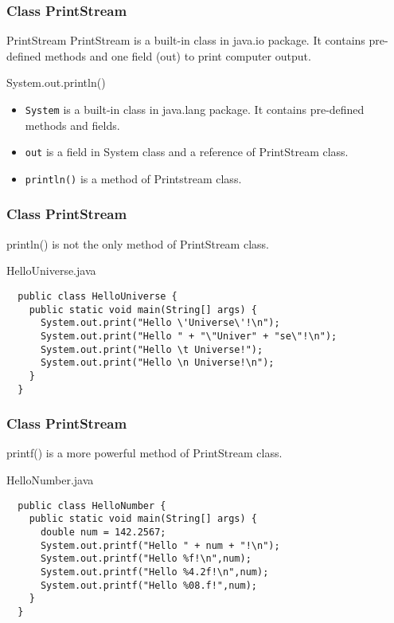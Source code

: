 \documentclass[10pt, compress]{beamer}
\begin{document}
\begin{frame}[fragile]
  \frametitle{Class PrintStream}
  \begin{block}{PrintStream}
    PrintStream is a built-in class in java.io package. It contains pre-defined methods and one field (out) to print computer output.
  \end{block}
  \begin{block}{System.out.println()}
    \begin{itemize}
      \item[] \texttt{System} is a built-in class in java.lang package. It contains pre-defined methods and fields.
      \item[] \texttt{out} is a field in System class and a reference of PrintStream class.
      \item[] \texttt{println()} is a method of Printstream class.
    \end{itemize}
  \end{block}
\end{frame}

\begin{frame}[fragile]
  \frametitle{Class PrintStream}
  println() is not the only method of PrintStream class.
  \begin{block}{HelloUniverse.java}
  \begin{verbatim}
  public class HelloUniverse {
    public static void main(String[] args) {
      System.out.print("Hello \'Universe\'!\n");
      System.out.print("Hello " + "\"Univer" + "se\"!\n");
      System.out.print("Hello \t Universe!");
      System.out.print("Hello \n Universe!\n");
    }
  }
  \end{verbatim}
  \end{block}
\end{frame}

\begin{frame}[fragile]
  \frametitle{Class PrintStream}
  printf() is a more powerful method of PrintStream class.
  \begin{block}{HelloNumber.java}
  \begin{verbatim}
  public class HelloNumber {
    public static void main(String[] args) {
      double num = 142.2567;
      System.out.printf("Hello " + num + "!\n");
      System.out.printf("Hello %f!\n",num);
      System.out.printf("Hello %4.2f!\n",num);
      System.out.printf("Hello %08.f!",num);
    }
  }
  \end{verbatim}
  \end{block}
\end{frame}
\end{document}
